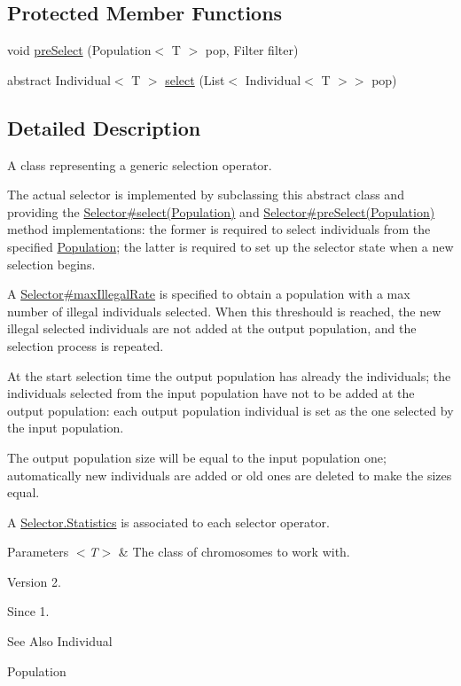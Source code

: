 \subsection*{Protected Member Functions}
\begin{DoxyCompactItemize}
\item 
void \hyperlink{classjenes_1_1stage_1_1operator_1_1_selector_3_01_t_01extends_01_chromosome_01_4_a752bf2650cbb6760d2fbb68718d62328}{pre\-Select} (Population$<$ T $>$ pop, Filter filter)
\item 
abstract Individual$<$ T $>$ \hyperlink{classjenes_1_1stage_1_1operator_1_1_selector_3_01_t_01extends_01_chromosome_01_4_af6cf22a6d6e70ffd74ee1f042a16dcd9}{select} (List$<$ Individual$<$ T $>$$>$ pop)
\end{DoxyCompactItemize}


\subsection{Detailed Description}
A class representing a generic selection operator. 

The actual selector is implemented by subclassing this abstract class and providing the \hyperlink{}{Selector\#select(\-Population)} and \hyperlink{}{Selector\#pre\-Select(\-Population)} method implementations\-: the former is required to select individuals from the specified \hyperlink{}{Population}; the latter is required to set up the selector state when a new selection begins. 

A \hyperlink{}{Selector\#max\-Illegal\-Rate} is specified to obtain a population with a max number of illegal individuals selected. When this threshould is reached, the new illegal selected individuals are not added at the output population, and the selection process is repeated. 

At the start selection time the output population has already the individuals; the individuals selected from the input population have not to be added at the output population\-: each output population individual is set as the one selected by the input population. 

The output population size will be equal to the input population one; automatically new individuals are added or old ones are deleted to make the sizes equal. 

A \hyperlink{}{Selector.\-Statistics} is associated to each selector operator.


\begin{DoxyParams}{Parameters}
{\em $<$\-T$>$} & The class of chromosomes to work with.\\
\hline
\end{DoxyParams}
\begin{DoxyVersion}{Version}
2. 
\end{DoxyVersion}
\begin{DoxySince}{Since}
1.
\end{DoxySince}
\begin{DoxySeeAlso}{See Also}
Individual 

Population 
\end{DoxySeeAlso}


